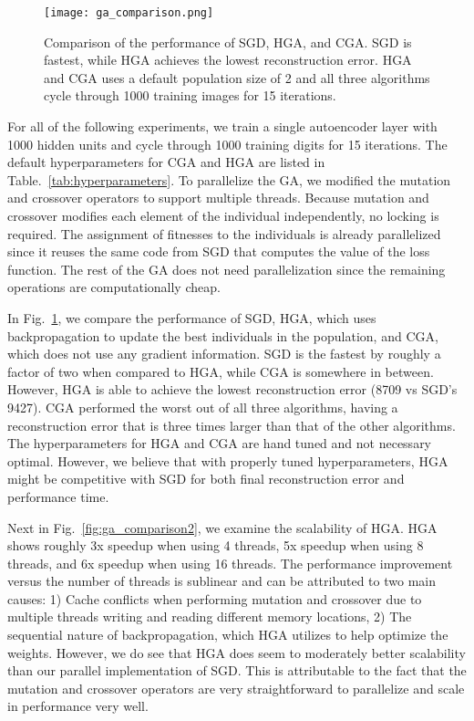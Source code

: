 \begin{figure}[h] \centering
  \texttt{[image: ga\_comparison.png]}
  \caption{Comparison of the performance of SGD, HGA, and CGA. SGD is fastest, while HGA achieves the lowest reconstruction error. HGA and CGA uses a default population size of 2 and all three algorithms cycle through 1000 training images for 15 iterations.}
  \label{fig:ga_comparison}
\end{figure}

For all of the following experiments, we train a single autoencoder layer with 1000 hidden units and cycle through 1000 training digits for 15 iterations. The default hyperparameters for CGA and HGA are listed in Table.~\ref{tab:hyperparameters}. To parallelize the GA, we modified the mutation and crossover operators to support multiple threads. Because mutation and crossover modifies each element of the individual independently, no locking is required. The assignment of fitnesses to the individuals is already parallelized since it reuses the same code from SGD that computes the value of the loss function. The rest of the GA does not need parallelization since the remaining operations are computationally cheap. 

In Fig.~\ref{fig:ga_comparison}, we compare the performance of SGD, HGA, which uses backpropagation to update the best individuals in the population, and CGA, which does not use any gradient information. SGD is the fastest by roughly a factor of two when compared to HGA, while CGA is somewhere in between. However, HGA is able to achieve the lowest reconstruction error (8709 vs SGD's 9427). CGA performed the worst out of all three algorithms, having a reconstruction error that is three times larger than that of the other algorithms. The hyperparameters for HGA and CGA are hand tuned and not necessary optimal. However, we believe that with properly tuned hyperparameters, HGA might be competitive with SGD for both final reconstruction error and performance time. 

Next in Fig.~\ref{fig:ga_comparison2}, we examine the scalability of HGA. HGA shows roughly 3x speedup when using 4 threads, 5x speedup when using 8 threads, and 6x speedup when using 16 threads. The performance improvement versus the number of threads is sublinear and can be attributed to two main causes: 1) Cache conflicts when performing mutation and crossover due to multiple threads writing and reading different memory locations, 2) The sequential nature of backpropagation, which HGA utilizes to help optimize the weights. However, we do see that HGA does seem to moderately better scalability than our parallel implementation of SGD. This is attributable to the fact that the mutation and crossover operators are very straightforward to parallelize and scale in performance very well. 

